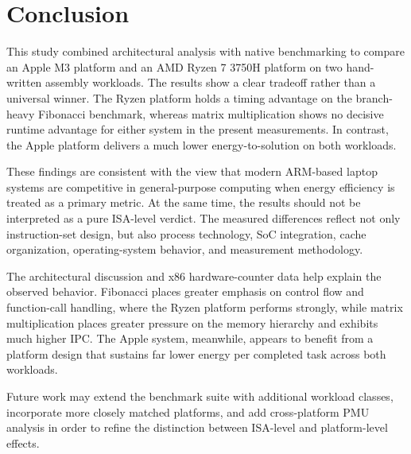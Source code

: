 \documentclass{tcsa}
\begin{document}
\section{Conclusion}

This study combined architectural analysis with native benchmarking to compare an
Apple M3 platform and an AMD Ryzen 7 3750H platform on two hand-written assembly
workloads. The results show a clear tradeoff rather than a universal winner. The
Ryzen platform holds a timing advantage on the branch-heavy Fibonacci benchmark,
whereas matrix multiplication shows no decisive runtime advantage for either system
in the present measurements. In contrast, the Apple platform delivers a much lower
energy-to-solution on both workloads.

These findings are consistent with the view that modern ARM-based laptop systems are
competitive in general-purpose computing when energy efficiency is treated as a
primary metric. At the same time, the results should not be interpreted as a pure
ISA-level verdict. The measured differences reflect not only instruction-set design,
but also process technology, SoC integration, cache organization, operating-system
behavior, and measurement methodology.

The architectural discussion and x86 hardware-counter data help explain the observed
behavior. Fibonacci places greater emphasis on control flow and function-call
handling, where the Ryzen platform performs strongly, while matrix multiplication
places greater pressure on the memory hierarchy and exhibits much higher IPC. The
Apple system, meanwhile, appears to benefit from a platform design that sustains far
lower energy per completed task across both workloads.

Future work may extend the benchmark suite with additional workload classes,
incorporate more closely matched platforms, and add cross-platform PMU analysis in
order to refine the distinction between ISA-level and platform-level effects.

\end{document}
